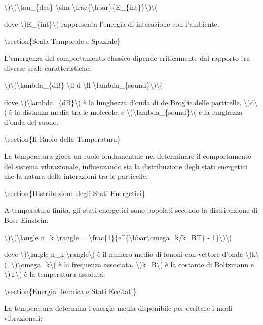 \documentclass[a4paper,11pt]{article}
\begin{document}
\textbackslash{})\textbackslash{}(\textbackslash{}tau\_\{dec\} \textbackslash{}sim \textbackslash{}frac\{\textbackslash{}hbar\}\{E\_\{int\}\}\textbackslash{})\textbackslash{}(

dove \textbackslash{})E\_\{int\}\textbackslash{}( rappresenta l'energia di interazione con l'ambiente.

\textbackslash{}section\{Scala Temporale e Spaziale\}

L'emergenza del comportamento classico dipende criticamente dal rapporto
tra diverse scale caratteristiche:

\textbackslash{})\textbackslash{}(\textbackslash{}lambda\_\{dB\} \textbackslash{}ll d \textbackslash{}ll \textbackslash{}lambda\_\{sound\}\textbackslash{})\textbackslash{}(

dove \textbackslash{})\textbackslash{}lambda\_\{dB\}\textbackslash{}( \`e la lunghezza d'onda di de Broglie delle
particelle, \textbackslash{})d\textbackslash{}( \`e la distanza media tra le molecole, e \textbackslash{})\textbackslash{}lambda\_\{sound\}\textbackslash{}(
\`e la lunghezza d'onda del suono.

\textbackslash{}section\{Il Ruolo della Temperatura\}

La temperatura gioca un ruolo fondamentale nel determinare il
comportamento del sistema vibrazionale, influenzando sia la
distribuzione degli stati energetici che la natura delle interazioni tra
le particelle.

\textbackslash{}section\{Distribuzione degli Stati Energetici\}

A temperatura finita, gli stati energetici sono popolati secondo la
distribuzione di Bose-Einstein:

\textbackslash{})\textbackslash{}(\textbackslash{}langle n\_k \textbackslash{}rangle = \textbackslash{}frac\{1\}\{e\textasciicircum{}\{\textbackslash{}hbar\textbackslash{}omega\_k/k\_BT\} - 1\}\textbackslash{})\textbackslash{}(

dove \textbackslash{})\textbackslash{}langle n\_k \textbackslash{}rangle\textbackslash{}( \`e il numero medio di fononi con vettore
d'onda \textbackslash{})k\textbackslash{}(, \textbackslash{})\textbackslash{}omega\_k\textbackslash{}( \`e la frequenza associata, \textbackslash{})k\_B\textbackslash{}( \`e la costante di
Boltzmann e \textbackslash{})T\textbackslash{}( \`e la temperatura assoluta.

\textbackslash{}section\{Energia Termica e Stati Eccitati\}

La temperatura determina l'energia media disponibile per eccitare i modi
vibrazionali:
\end{document}
